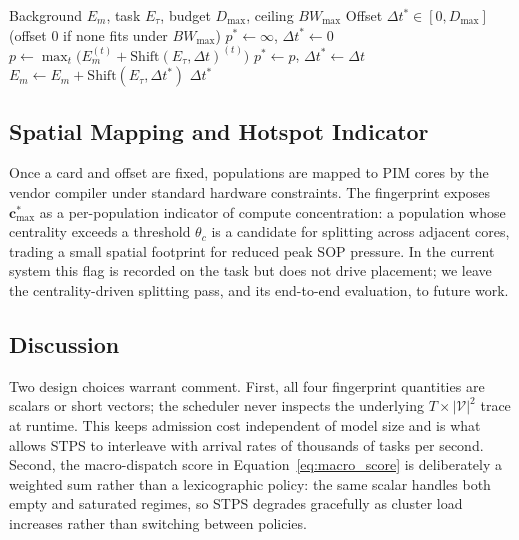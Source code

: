 \documentclass[letterpaper,twocolumn,10pt]{article}
\begin{document}
\begin{algorithm}[t]
\caption{Phase-Shift Selection}
\label{alg:phase_shift}
\begin{algorithmic}[1]
\Require Background $E_m$, task $E_\tau$, budget $D_{\max}$, ceiling $BW_{\max}$
\Ensure Offset $\Delta t^{*} \in [0, D_{\max}]$ (offset $0$ if none fits under $BW_{\max}$)
\State $p^* \gets \infty$,\; $\Delta t^{*} \gets 0$ 
    \State $p \gets \max_t \bigl(E_m^{(t)} + \mathrm{Shift}(E_\tau, \Delta t)^{(t)}\bigr)$
        \State $p^* \gets p$,\; $\Delta t^{*} \gets \Delta t$
    \EndIf
\EndFor
\State $E_m \gets E_m + \mathrm{Shift}(E_\tau, \Delta t^{*})$
\State \Return $\Delta t^{*}$
\end{algorithmic}
\end{algorithm}

\subsection{Spatial Mapping and Hotspot Indicator}
\label{sec:design:spatial}

Once a card and offset are fixed, populations are mapped to PIM cores by the vendor compiler under standard hardware constraints. The fingerprint exposes $\mathbf{c}^{*}_{\max}$ as a per-population indicator of compute concentration: a population whose centrality exceeds a threshold $\theta_c$ is a candidate for splitting across adjacent cores, trading a small spatial footprint for reduced peak SOP pressure. In the current system this flag is recorded on the task but does not drive placement; we leave the centrality-driven splitting pass, and its end-to-end evaluation, to future work.

\subsection{Discussion}
\label{sec:design:discussion}

Two design choices warrant comment. First, all four fingerprint quantities are scalars or short vectors; the scheduler never inspects the underlying $T \times |\mathcal{V}|^2$ trace at runtime. This keeps admission cost independent of model size and is what allows STPS to interleave with arrival rates of thousands of tasks per second. Second, the macro-dispatch score in Equation~\ref{eq:macro_score} is deliberately a weighted sum rather than a lexicographic policy: the same scalar handles both empty and saturated regimes, so STPS degrades gracefully as cluster load increases rather than switching between policies.
\end{document}
